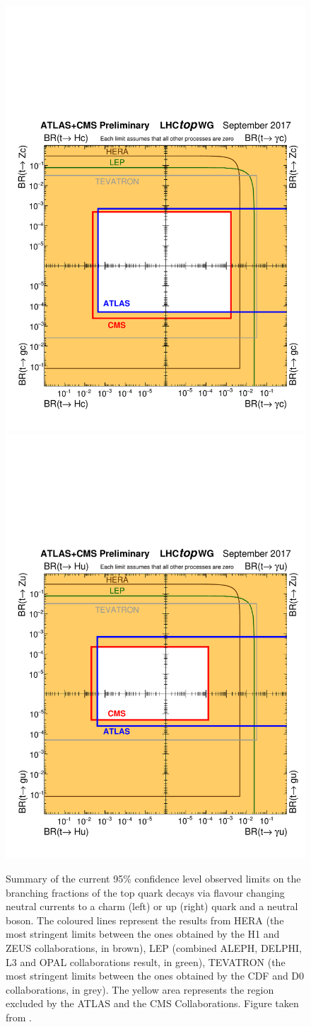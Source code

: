 \begin{figure}[htbp]
	\centering
	\includegraphics[width=0.49\linewidth]{1_Introduction/Figures/fcnc_tXc_sep17.pdf}
	\includegraphics[width=0.49\linewidth]{1_Introduction/Figures/fcnc_tXu_sep17.pdf}
	\caption{Summary of the current 95\% confidence level observed limits on the branching fractions of the top quark decays via flavour changing neutral currents to a charm (left) or up (right) quark and a neutral boson. The coloured lines represent the results from HERA (the most stringent limits between the ones obtained by the H1 and ZEUS collaborations, in brown), LEP (combined ALEPH, DELPHI, L3 and OPAL collaborations result, in green), TEVATRON (the most stringent limits between the ones obtained by the CDF and D0 collaborations, in grey). The yellow area represents the region excluded by the ATLAS and the CMS Collaborations. Figure taken from \cite{summarytwiki}.}
	\label{fig:FCNCATLASCMS}
\end{figure}
